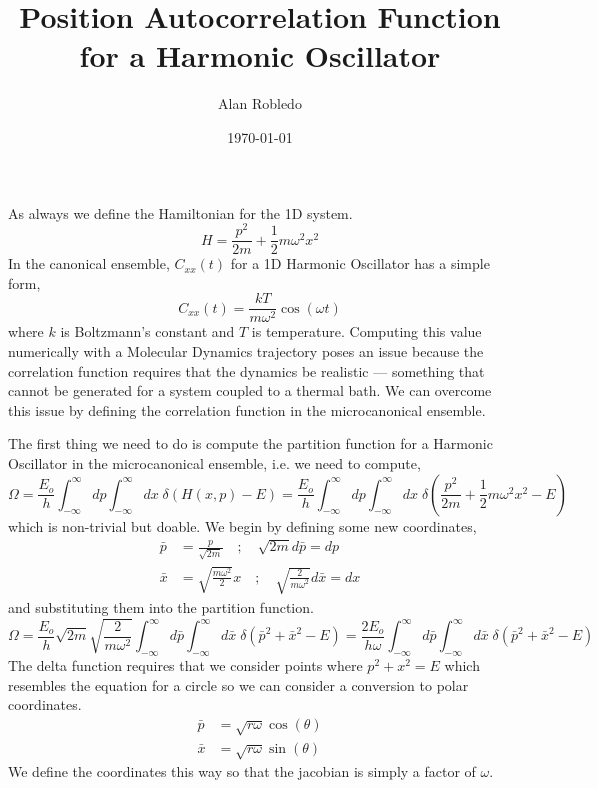 \documentclass{article}
\title{Position Autocorrelation Function for a Harmonic Oscillator}
\date{\today}
\author{Alan Robledo}
\newcommand{\be}{\begin{equation}}
\newcommand{\ee}{\end{equation}}
\begin{document}
\maketitle
As always we define the Hamiltonian for the 1D system.
\be
  H = \frac{p^2}{2m} + \frac{1}{2} m \omega^2 x^2
\ee
In the canonical ensemble, $C_{xx}(t)$ for a 1D Harmonic Oscillator has a simple form,
\be
  C_{xx}(t) = \frac{kT}{m \omega^2} \cos(\omega t)
\ee
where $k$ is Boltzmann's constant and $T$ is temperature. Computing this value numerically with a Molecular Dynamics trajectory poses an issue because the correlation function requires that the dynamics be realistic --- something that cannot be generated for a system coupled to a thermal bath. We can overcome this issue by defining the correlation function in the microcanonical ensemble.

The first thing we need to do is compute the partition function for a Harmonic Oscillator in the microcanonical ensemble, i.e. we need to compute,
\be
  \Omega = \frac{E_o}{h} \int_{-\infty}^{\infty} dp \int_{-\infty}^{\infty} dx \; \delta(H(x,p) - E) = \frac{E_o}{h} \int_{-\infty}^{\infty} dp \int_{-\infty}^{\infty} dx \; \delta\left( \frac{p^2}{2m} + \frac{1}{2} m \omega^2 x^2 - E \right)
\ee
which is non-trivial but doable. We begin by defining some new coordinates,
\be \label{eq:bar_coords}
  \begin{split}
    \bar{p} &= \frac{p}{\sqrt{2m}} \quad ; \quad \sqrt{2m} d\bar{p} = dp \\
    \bar{x} &= \sqrt{ \frac{m \omega^2}{2} } x \quad ; \quad \sqrt{ \frac{2}{m \omega^2} } d\bar{x} = dx
  \end{split}
\ee
and substituting them into the partition function.
\be
  \Omega = \frac{E_o}{h} \sqrt{2m} \sqrt{ \frac{2}{m \omega^2} } \int_{-\infty}^{\infty} d \bar{p} \int_{-\infty}^{\infty} d\bar{x} \; \delta\left( \bar{p}^2 + \bar{x}^2 - E \right) = \frac{2 E_o}{h \omega} \int_{-\infty}^{\infty} d \bar{p} \int_{-\infty}^{\infty} d\bar{x} \; \delta\left( \bar{p}^2 + \bar{x}^2 - E \right)
\ee
The delta function requires that we consider points where $p^2 + x^2 = E$ which resembles the equation for a circle so we can consider a conversion to polar coordinates.
\be \label{eq:polar_coords}
  \begin{split}
    \bar{p} &= \sqrt{r \omega} \cos(\theta) \\
    \bar{x} &= \sqrt{r \omega} \sin(\theta)
  \end{split}
\ee
We define the coordinates this way so that the jacobian is simply a factor of $\omega$.
\end{document}
